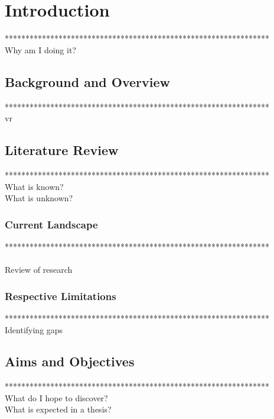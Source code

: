 \label{chapter-introduction}
\chapter{Introduction}

****************************************************************\\%
Why am I doing it?\\

\section{Background and Overview}

****************************************************************\\%
vr\\

\section{Literature Review}

****************************************************************\\%
What is known?\\
What is unknown?\\

\subsection{Current Landscape}

****************************************************************\\%
\\Review of research\\

\subsection{Respective Limitations}

****************************************************************\\%
Identifying gaps\\

\section{Aims and Objectives}

****************************************************************\\%
What do I hope to discover?\\
What is expected in a thesis?\\

